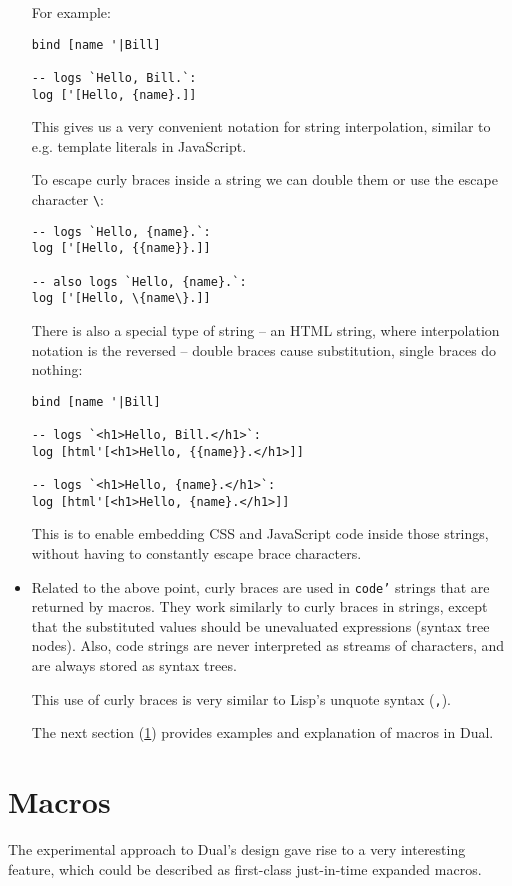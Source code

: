 \begin{itemize}
    For example:
\begin{lstlisting}
bind [name '|Bill]

-- logs `Hello, Bill.`:
log ['[Hello, {name}.]]
\end{lstlisting}
    
    This gives us a very convenient notation for string
    interpolation, similar to e.g. template literals in
    JavaScript\cite{mdn_template_strings}.
    
    To escape curly braces inside a string we can double them or use the escape character \texttt{\textbackslash}:
\begin{lstlisting}
-- logs `Hello, {name}.`:
log ['[Hello, {{name}}.]]

-- also logs `Hello, {name}.`:
log ['[Hello, \{name\}.]]
\end{lstlisting}
    
    There is also a special type of string -- an HTML string, where interpolation notation is the reversed -- double braces cause substitution, single braces do nothing:
\begin{lstlisting}
bind [name '|Bill]

-- logs `<h1>Hello, Bill.</h1>`:
log [html'[<h1>Hello, {{name}}.</h1>]]

-- logs `<h1>Hello, {name}.</h1>`:
log [html'[<h1>Hello, {name}.</h1>]]
\end{lstlisting}
    
    This is to enable embedding CSS and JavaScript code inside those strings,
    without having to constantly escape brace characters.
    
    \item Related to the above point, curly braces are used in \texttt{code'} strings that are returned by macros. They work similarly to curly braces in strings, except that the substituted values should be unevaluated expressions (syntax tree nodes). Also, code strings are never interpreted as streams of characters, and are always stored as syntax trees.
    
    This use of curly braces is very similar to Lisp's unquote syntax (\texttt{,})\cite[Section~1.3.8]{racket_reference}.
    
    The next section (\ref{sec:mac}) provides examples and explanation of macros in Dual.
\end{itemize}

\section{Macros}\label{sec:mac}
The experimental approach to Dual's design gave rise to a very interesting feature, which could be described as first-class just-in-time expanded macros.

